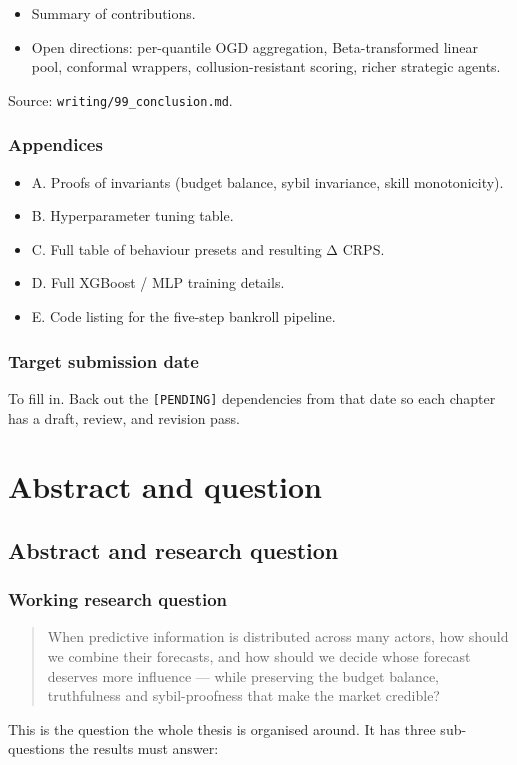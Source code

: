 \documentclass[11pt,a4paper,openany]{report}
\begin{document}
\begin{itemize}
  \item Summary of contributions.
  \item Open directions: per-quantile OGD aggregation, Beta-transformed linear
    pool, conformal wrappers, collusion-resistant scoring, richer strategic
    agents.
\end{itemize}

Source: \texttt{writing/99\_conclusion.md}.

\section{Appendices}

\begin{itemize}
  \item A. Proofs of invariants (budget balance, sybil invariance, skill
    monotonicity).
  \item B. Hyperparameter tuning table.
  \item C. Full table of behaviour presets and resulting Δ CRPS.
  \item D. Full XGBoost / MLP training details.
  \item E. Code listing for the five-step bankroll pipeline.
\end{itemize}

\section{Target submission date}

To fill in. Back out the \texttt{[PENDING]} dependencies from that date so each
chapter has a draft, review, and revision pass.

\part*{Abstract and question}
\chapter{Abstract and research question}

\section{Working research question}

\begin{quote}
When predictive information is distributed across many actors, how should
we combine their forecasts, and how should we decide whose forecast
deserves more influence — while preserving the budget balance,
truthfulness and sybil-proofness that make the market credible?

\end{quote}
This is the question the whole thesis is organised around. It has three
sub-questions the results must answer:
\end{document}
